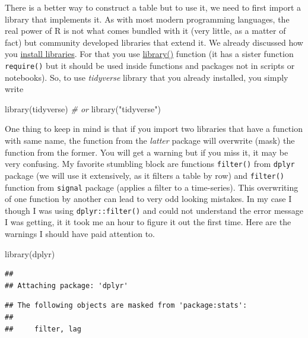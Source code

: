 \documentclass[
]{book}
\newenvironment{Shaded}{\begin{snugshade}}{\end{snugshade}}
\newcommand{\CommentTok}[1]{\textcolor[rgb]{0.56,0.35,0.01}{\textit{#1}}}
\newcommand{\FunctionTok}[1]{\textcolor[rgb]{0.00,0.00,0.00}{#1}}
\newcommand{\NormalTok}[1]{#1}
\newcommand{\StringTok}[1]{\textcolor[rgb]{0.31,0.60,0.02}{#1}}
\begin{document}
There is a better way to construct a table but to use it, we need to first import a library that implements it. As with most modern programming languages, the real power of R is not what comes bundled with it (very little, as a matter of fact) but community developed libraries that extend it. We already discussed how you \protect\hyperlink{install.packages}{install libraries}. For that you use \href{https://www.rdocumentation.org/packages/base/versions/3.6.2/topics/library}{library()} function (it has a sister function \texttt{require()} but it should be used inside functions and packages not in scripts or notebooks). So, to use \emph{tidyverse} library that you already installed, you simply write

\begin{Shaded}
\begin{Highlighting}[]
\FunctionTok{library}\NormalTok{(tidyverse)}
\CommentTok{\# or}
\FunctionTok{library}\NormalTok{(}\StringTok{"tidyverse"}\NormalTok{)}
\end{Highlighting}
\end{Shaded}

One thing to keep in mind is that if you import two libraries that have a function with same name, the function from the \emph{latter} package will overwrite (mask) the function from the former. You will get a warning but if you miss it, it may be very confusing. My favorite stumbling block are functions \texttt{filter()} from \texttt{dplyr} package (we will use it extensively, as it filters a table by row) and \texttt{filter()} function from \texttt{signal} package (applies a filter to a time-series). This overwriting of one function by another can lead to very odd looking mistakes. In my case I though I was using \texttt{dplyr::filter()} and could not understand the error message I was getting, it it took me an hour to figure it out the first time. Here are the warnings I should have paid attention to.

\begin{Shaded}
\begin{Highlighting}[]
\FunctionTok{library}\NormalTok{(dplyr)}
\end{Highlighting}
\end{Shaded}

\begin{verbatim}
## 
## Attaching package: 'dplyr'
\end{verbatim}

\begin{verbatim}
## The following objects are masked from 'package:stats':
## 
##     filter, lag
\end{verbatim}
\end{document}
